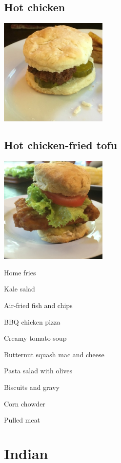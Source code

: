 \documentclass[
]{book}
\begin{document}
\hypertarget{hotchicken}{%
\subsection*{Hot chicken}\label{hotchicken}}

\includegraphics[width=0.4\textwidth,height=\textheight]{hot_chicken_small.jpg}

\hypertarget{hottofu}{%
\subsection*{Hot chicken-fried tofu}\label{hottofu}}

\includegraphics[width=0.4\textwidth,height=\textheight]{hot_chicken_tofu_small.jpg}

Home fries

Kale salad

Air-fried fish and chips

BBQ chicken pizza

Creamy tomato soup

Butternut squash mac and cheese

Pasta salad with olives

Biscuits and gravy

Corn chowder

Pulled meat

\hypertarget{indian}{%
\section*{Indian}\label{indian}}
\end{document}
